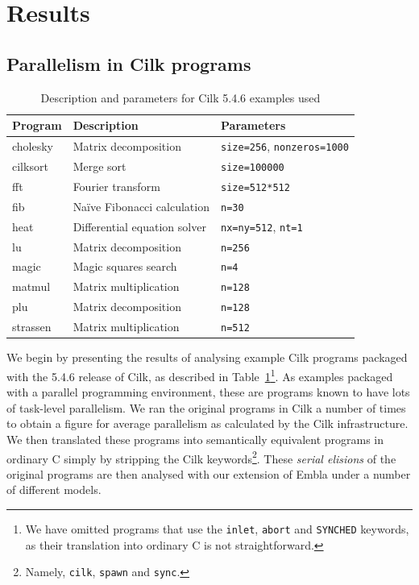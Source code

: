 \section{Results} \label{sresults}

\subsection{Parallelism in Cilk programs}

\begin{table}
\small
\begin{tabular}{ | l | l | l | }
\hline
Program & Description & Parameters \\
\hline
cholesky & Matrix decomposition & \texttt{size=256}, \texttt{nonzeros=1000} \\
cilksort & Merge sort & \texttt{size=100000} \\
fft & Fourier transform & \texttt{size=512*512} \\
fib & Na\"ive Fibonacci calculation & \texttt{n=30} \\
heat & Differential equation solver & \texttt{nx=ny=512}, \texttt{nt=1} \\ 
lu & Matrix decomposition & \texttt{n=256} \\
magic & Magic squares search & \texttt{n=4} \\
matmul & Matrix multiplication & \texttt{n=128} \\
plu & Matrix decomposition & \texttt{n=128} \\
strassen & Matrix multiplication & \texttt{n=512} \\
\hline
\end{tabular}
\caption{Description and parameters for Cilk 5.4.6 examples used}
\label{cilk-ex}
\end{table}

We begin by presenting the results of analysing example Cilk programs packaged with the 5.4.6 release of Cilk, as described in Table~\ref{cilk-ex}\footnote{We have omitted programs that use the \texttt{inlet}, \texttt{abort} and \texttt{SYNCHED} keywords, as their translation into ordinary C is not straightforward.}.
As examples packaged with a parallel programming environment, these are programs known to have lots of task-level parallelism.
We ran the original programs in Cilk a number of times to obtain a figure for average parallelism as calculated by the Cilk infrastructure.
We then translated these programs into semantically equivalent programs in ordinary C simply by stripping the Cilk keywords\footnote{Namely, \texttt{cilk}, \texttt{spawn} and \texttt{sync}.}.
These \emph{serial elisions} of the original programs are then analysed with our extension of Embla under a number of different models.

